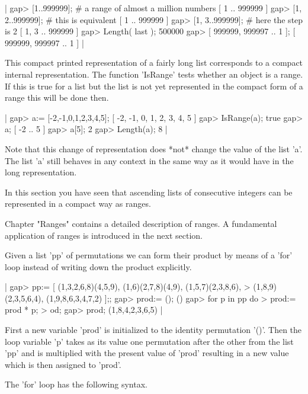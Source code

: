 |    gap> [1..999999];    #  a range of almost a million numbers
    [ 1 .. 999999 ]
    gap> [1, 2..999999];  #  this is equivalent
    [ 1 .. 999999 ]
    gap> [1, 3..999999];  #  here the step is 2
    [ 1, 3 .. 999999 ]
    gap> Length( last );
    500000
    gap> [ 999999, 999997 .. 1 ];
    [ 999999, 999997 .. 1 ] |

This compact printed representation of a fairly long  list corresponds to
a  compact internal representation.  The function 'IsRange' tests whether
an object is a range.  If this is true for a list but the list is not yet
represented in the compact form of a range this will be done then.

|    gap> a:= [-2,-1,0,1,2,3,4,5];
    [ -2, -1, 0, 1, 2, 3, 4, 5 ]
    gap> IsRange(a);
    true
    gap> a;
    [ -2 .. 5 ]
    gap> a[5];
    2
    gap> Length(a);
    8 |

Note that this change  of representation  does *not* change  the value of
the list 'a'.   The list 'a' still behaves in any context in the same way
as it would have in the long representation.

In  this  section you  have seen  that  ascending  lists  of  consecutive
integers can be represented in a compact way as ranges.

Chapter  "Ranges"  contains   a   detailed   description  of  ranges.   A
fundamental application of ranges is introduced in the next section.


Given a list 'pp' of permutations we can form their product by means of a
'for' loop instead of writing down the product explicitly.

|    gap> pp:= [ (1,3,2,6,8)(4,5,9), (1,6)(2,7,8)(4,9), (1,5,7)(2,3,8,6),
    >           (1,8,9)(2,3,5,6,4), (1,9,8,6,3,4,7,2) ];;
    gap> prod:= ();
    ()
    gap> for p in pp do
    >       prod:= prod * p;
    >    od;
    gap> prod;
    (1,8,4,2,3,6,5) |

First  a  new variable 'prod' is initialized to the  identity permutation
'()'.  Then  the  loop variable 'p'  takes as its  value one  permutation
after the other from  the  list  'pp' and is multiplied with  the present
value of  'prod'  resulting in a new  value  which  is then  assigned  to
'prod'.

The 'for' loop has the following syntax.

